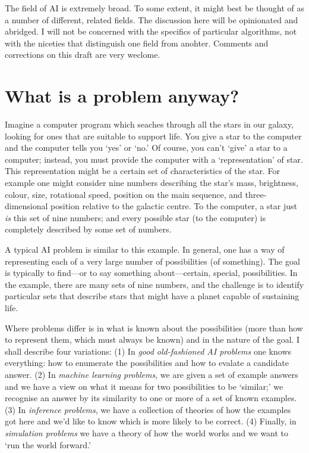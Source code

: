 \documentclass[10pt, a4paper, twocolumn]{article}
\begin{document}
The field of AI is extremely broad. To some extent, it might best be thought of
as a number of different, related fields. The discussion here will be
opinionated and abridged. I will not be concerned with the specifics of
particular algorithms, not with the niceties that distinguish one field from
anohter. Comments and corrections on this draft are very weclome.


\section{What is a problem anyway?}

Imagine a computer program which seaches through all the stars in our galaxy,
looking for ones that are suitable to support life. You give a star to the
computer and the computer tells you `yes' or `no.' Of course, you can't `give' a
star to a computer; instead, you must provide the computer with a
`representation' of star. This representation might be a certain set of
characteristics of the star. For example one might consider nine numbers
describing the star's mass, brightness, colour, size, rotational speed, position
on the main sequence, and three-dimensional position relative to the galactic
centre. To the computer, a star just \emph{is} this set of nine numbers; and
every possible star (to the computer) is completely described by some set of
numbers.

A typical AI problem is similar to this example. In general, one has a way of
representing each of a very large number of possibilities (of something). The
goal is typically to find---or to say something about---certain, special,
possibilities. In the example, there are many sets of nine numbers, and the
challenge is to identify particular sets that describe stars that might have a
planet capable of sustaining life.

Where problems differ is in what is known about the possibilities (more than how
to represent them, which must always be known) and in the nature of the goal. I
shall describe four variations: (1) In \emph{good old-fashioned AI problems} one
knows everything: how to enumerate the possibilities and how to evalate a
candidate answer. (2) In \emph{machine learning problems}, we are given a set of
example answers and we have a view on what it means for two possibilities to be
`similar;' we recognise an answer by its similarity to one or more of a set of
known examples. (3) In \emph{inference problems}, we have a collection of
theories of how the examples got here and we'd like to know which is more likely
to be correct. (4) Finally, in \emph{simulation problems} we have a theory of
how the world works and we want to `run the world forward.'
\end{document}
